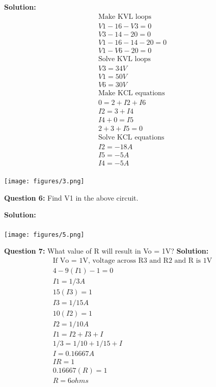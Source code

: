 \documentclass{article}
\begin{document}
\textbf{Solution:}
\begin{align*}
    \text{Make KVL loops}\\
    V1 - 16 - V3 = 0\\ 
    V3 - 14 - 20 = 0  \\
    V1 - 16 - 14 - 20 = 0\\
    V1 - V6 - 20 = 0 \\
     \text{Solve KVL loops}\\
    \boxed{V3 = 34 V}\\
    \boxed{V1 = 50V} \\
    \boxed{V6 = 30V}\\
    \text{Make KCL equations}\\
    0 = 2 + I2 + I6\\
    I2 = 3 + I4\\
    I4 + 0 = I5\\
    2 + 3 + I5 = 0\\
    \text{Solve KCL equations}\\
    \boxed{I2 = -18 A}\\
    \boxed{I5 = -5 A}\\
    \boxed{I4 = -5A }\\
\end{align*}

\begin{center}
    \texttt{[image: figures/3.png]}
\end{center}

\textbf{Question 6:} Find V1 in the above circuit.

\textbf{Solution:}
\begin{align*}
\end{align*}


\begin{center}

    \texttt{[image: figures/5.png]}

\end{center}



\textbf{Question 7:} What value of R will result in Vo = 1V?
\textbf{Solution:}
\begin{align*}
 \text{If Vo = 1V, voltage across R3 and R2 and R is 1V}\\
    4 - 9(I1) - 1 = 0\\
    I1 = 1/3 A\\
    15(I3) = 1\\
    I3 = 1/15 A\\
    10(I2) = 1\\
    I2 = 1/10 A\\
    I1 = I2 + I3 + I\\
    1/3 = 1/10 + 1/15 + I\\
    I = 0.16667 A\\
    IR = 1\\
    0.16667(R) = 1\\
    \boxed{R =  6 ohms}\\
\end{align*}
 
\end{document}

